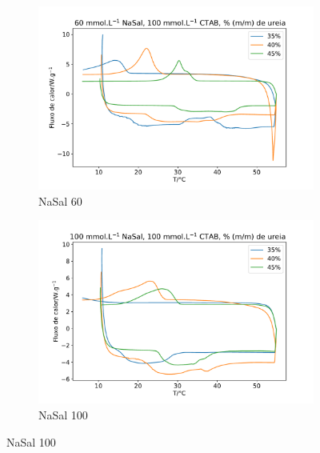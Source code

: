 \begin{figure}
	\begin{subfigure}{0.5\textwidth}
		\centering
		\includegraphics[width=\textwidth]{./imagens/dsc/NaSal60}
		\caption{NaSal 60\mM}
		\label{fig:DSC_NaSal60}
	\end{subfigure} \qquad %
	\begin{subfigure}{0.5\textwidth}
		\centering
		\includegraphics[width=\textwidth]{./imagens/dsc/NaSal100}
		\caption{NaSal 100\mM}
		\label{fig:DSC_NaSal100}
	\end{subfigure}
	

\end{figure}
